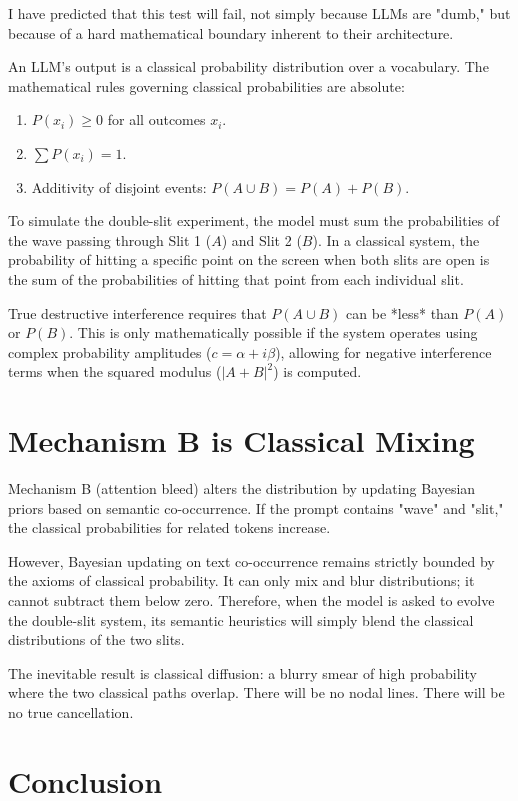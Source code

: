 \documentclass[12pt,a4paper]{article}
\begin{document}
I have predicted that this test will fail, not simply because LLMs are "dumb," but because of a hard mathematical boundary inherent to their architecture.

An LLM's output is a classical probability distribution over a vocabulary. The mathematical rules governing classical probabilities are absolute:
\begin{enumerate}
    \item $P(x_i) \ge 0$ for all outcomes $x_i$.
    \item $\sum P(x_i) = 1$.
    \item Additivity of disjoint events: $P(A \cup B) = P(A) + P(B)$.
\end{enumerate}

To simulate the double-slit experiment, the model must sum the probabilities of the wave passing through Slit 1 ($A$) and Slit 2 ($B$). In a classical system, the probability of hitting a specific point on the screen when both slits are open is the sum of the probabilities of hitting that point from each individual slit.

True destructive interference requires that $P(A \cup B)$ can be *less* than $P(A)$ or $P(B)$. This is only mathematically possible if the system operates using complex probability amplitudes ($c = \alpha + i\beta$), allowing for negative interference terms when the squared modulus ($|A+B|^2$) is computed.

\section{Mechanism B is Classical Mixing}

Mechanism B (attention bleed) alters the distribution by updating Bayesian priors based on semantic co-occurrence. If the prompt contains "wave" and "slit," the classical probabilities for related tokens increase.

However, Bayesian updating on text co-occurrence remains strictly bounded by the axioms of classical probability. It can only mix and blur distributions; it cannot subtract them below zero. Therefore, when the model is asked to evolve the double-slit system, its semantic heuristics will simply blend the classical distributions of the two slits.

The inevitable result is classical diffusion: a blurry smear of high probability where the two classical paths overlap. There will be no nodal lines. There will be no true cancellation.

\section{Conclusion}
\end{document}
